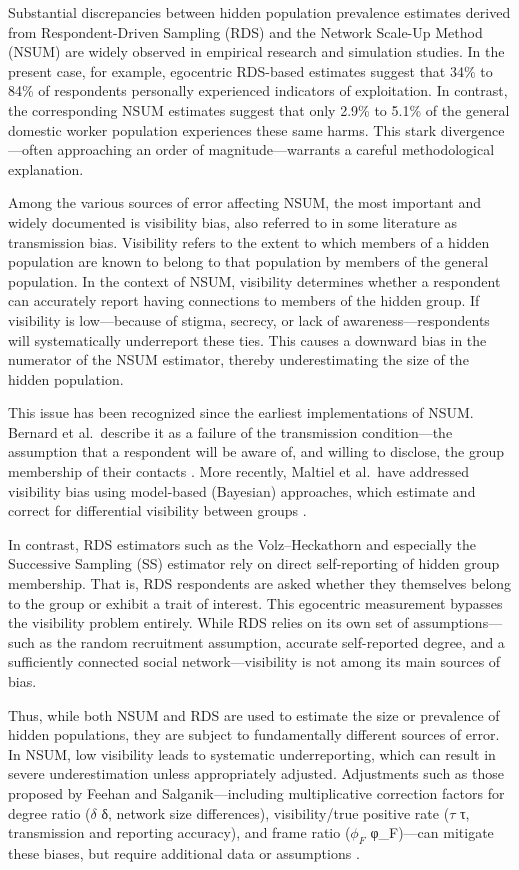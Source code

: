 \documentclass[
  12pt,
  letterpaper,
  DIV=11,
  numbers=noendperiod]{scrartcl}
\theoremstyle{plain}
\theoremstyle{definition}
\begin{document}
Substantial discrepancies between hidden population prevalence estimates
derived from Respondent-Driven Sampling (RDS) and the Network Scale-Up
Method (NSUM) are widely observed in empirical research and simulation
studies. In the present case, for example, egocentric RDS-based
estimates suggest that 34\% to 84\% of respondents personally
experienced indicators of exploitation. In contrast, the corresponding
NSUM estimates suggest that only 2.9\% to 5.1\% of the general domestic
worker population experiences these same harms. This stark
divergence---often approaching an order of magnitude---warrants a
careful methodological explanation.

Among the various sources of error affecting NSUM, the most important
and widely documented is visibility bias, also referred to in some
literature as transmission bias. Visibility refers to the extent to
which members of a hidden population are known to belong to that
population by members of the general population. In the context of NSUM,
visibility determines whether a respondent can accurately report having
connections to members of the hidden group. If visibility is
low---because of stigma, secrecy, or lack of awareness---respondents
will systematically underreport these ties. This causes a downward bias
in the numerator of the NSUM estimator, thereby underestimating the size
of the hidden population.

This issue has been recognized since the earliest implementations of
NSUM. Bernard et al.~describe it as a failure of the transmission
condition---the assumption that a respondent will be aware of, and
willing to disclose, the group membership of their contacts
\autocite{bern10-counting}. More recently, Maltiel et al.~have addressed
visibility bias using model-based (Bayesian) approaches, which estimate
and correct for differential visibility between groups
\autocite{malt15-estimating}.

In contrast, RDS estimators such as the Volz--Heckathorn and especially
the Successive Sampling (SS) estimator rely on direct self-reporting of
hidden group membership. That is, RDS respondents are asked whether they
themselves belong to the group or exhibit a trait of interest. This
egocentric measurement bypasses the visibility problem entirely. While
RDS relies on its own set of assumptions---such as the random
recruitment assumption, accurate self-reported degree, and a
sufficiently connected social network---visibility is not among its main
sources of bias.

Thus, while both NSUM and RDS are used to estimate the size or
prevalence of hidden populations, they are subject to fundamentally
different sources of error. In NSUM, low visibility leads to systematic
underreporting, which can result in severe underestimation unless
appropriately adjusted. Adjustments such as those proposed by Feehan and
Salganik---including multiplicative correction factors for degree ratio
(\(\delta\) δ, network size differences), visibility/true positive rate
(\(\tau\) τ, transmission and reporting accuracy), and frame ratio
(\(\phi_F\) φ\_F)---can mitigate these biases, but require additional
data or assumptions \autocite{feeh16-generalizing}.
\end{document}
